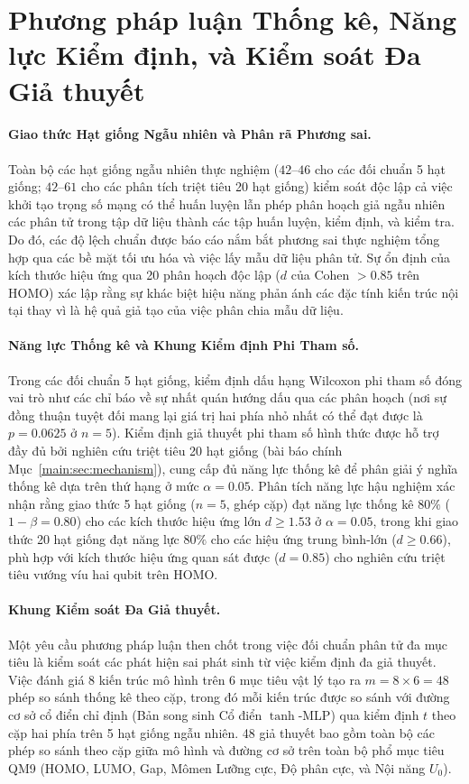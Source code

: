 \documentclass[10pt,twocolumn,letterpaper]{article}
\begin{document}
\section{Phương pháp luận Thống kê, Năng lực Kiểm định, và Kiểm soát Đa Giả thuyết}
\label{sm:fdr}
\label{sm:seed_protocol}
\label{sec:sm_fdr_table}

\paragraph{Giao thức Hạt giống Ngẫu nhiên và Phân rã Phương sai.}
Toàn bộ các hạt giống ngẫu nhiên thực nghiệm ($42$--$46$ cho các đối chuẩn 5 hạt giống; $42$--$61$ cho các phân tích triệt tiêu 20 hạt giống) kiểm soát độc lập cả việc khởi tạo trọng số mạng có thể huấn luyện lẫn phép phân hoạch giả ngẫu nhiên các phân tử trong tập dữ liệu thành các tập huấn luyện, kiểm định, và kiểm tra. Do đó, các độ lệch chuẩn được báo cáo nắm bắt phương sai thực nghiệm tổng hợp qua các bề mặt tối ưu hóa và việc lấy mẫu dữ liệu phân tử. Sự ổn định của kích thước hiệu ứng qua 20 phân hoạch độc lập ($d$ của Cohen $> 0.85$ trên HOMO) xác lập rằng sự khác biệt hiệu năng phản ánh các đặc tính kiến trúc nội tại thay vì là hệ quả giả tạo của việc phân chia mẫu dữ liệu.

\paragraph{Năng lực Thống kê và Khung Kiểm định Phi Tham số.}
Trong các đối chuẩn 5 hạt giống, kiểm định dấu hạng Wilcoxon phi tham số đóng vai trò như các chỉ báo về sự nhất quán hướng dấu qua các phân hoạch (nơi sự đồng thuận tuyệt đối mang lại giá trị hai phía nhỏ nhất có thể đạt được là $p = 0.0625$ ở $n=5$). Kiểm định giả thuyết phi tham số hình thức được hỗ trợ đầy đủ bởi nghiên cứu triệt tiêu 20 hạt giống (bài báo chính Mục~\ref{main:sec:mechanism}), cung cấp đủ năng lực thống kê để phân giải ý nghĩa thống kê dựa trên thứ hạng ở mức $\alpha = 0.05$. Phân tích năng lực hậu nghiệm xác nhận rằng giao thức 5 hạt giống ($n = 5$, ghép cặp) đạt năng lực thống kê $80\%$ ($1-\beta = 0.80$) cho các kích thước hiệu ứng lớn $d \ge 1.53$ ở $\alpha = 0.05$, trong khi giao thức 20 hạt giống đạt năng lực $80\%$ cho các hiệu ứng trung bình-lớn ($d \ge 0.66$), phù hợp với kích thước hiệu ứng quan sát được ($d = 0.85$) cho nghiên cứu triệt tiêu vướng víu hai qubit trên HOMO.

\paragraph{Khung Kiểm soát Đa Giả thuyết.}
Một yêu cầu phương pháp luận then chốt trong việc đối chuẩn phân tử đa mục tiêu là kiểm soát các phát hiện sai phát sinh từ việc kiểm định đa giả thuyết. Việc đánh giá 8 kiến trúc mô hình trên 6 mục tiêu vật lý tạo ra $m = 8 \times 6 = 48$ phép so sánh thống kê theo cặp, trong đó mỗi kiến trúc được so sánh với đường cơ sở cổ điển chỉ định (Bản song sinh Cổ điển $\tanh$-MLP) qua kiểm định $t$ theo cặp hai phía trên 5 hạt giống ngẫu nhiên. 48 giả thuyết bao gồm toàn bộ các phép so sánh theo cặp giữa mô hình và đường cơ sở trên toàn bộ phổ mục tiêu QM9 (HOMO, LUMO, Gap, Mômen Lưỡng cực, Độ phân cực, và Nội năng $U_0$).
\end{document}
